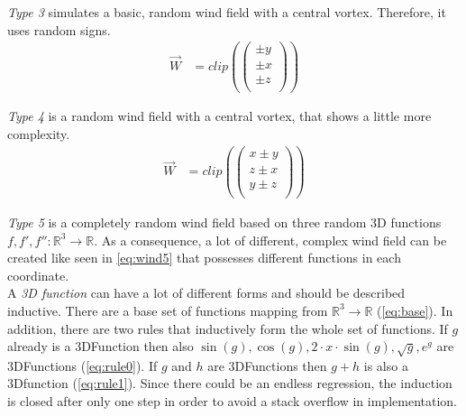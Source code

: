 \emph{Type 3} simulates a basic, random wind field with a central vortex. Therefore, it uses random signs.
\begin{align}
	\overrightarrow{W} &= clip(\left(
	\begin{array}{c}
		\pm y\\
		\pm x\\
		\pm z\\
	\end{array}
	\right))
\end{align}
\newline

\emph{Type 4} is a random wind field with a central vortex, that shows a little more complexity.
\begin{align}
	\overrightarrow{W} &= clip(\left(
	\begin{array}{c}
		x \pm y\\
		z \pm x\\
		y \pm z\\
	\end{array}
	\right))
\end{align}
\newline

\emph{Type 5} is a completely random wind field based on three random 3D functions $f, f', f'': \mathbb{R}^3 \to \mathbb{R}$. 
As a consequence, a lot of different, complex wind field can be created like seen in \cref{eq:wind5} that possesses different functions in each coordinate.\\

A \emph{3D function} can have a lot of different forms and should be described inductive. 
There are a base set of functions mapping from $\mathbb{R}^3 \to \mathbb{R}$ (\cref{eq:base}). 
In addition, there are two rules that inductively form the whole set of functions. 
If $g$ already is a 3DFunction then also $\sin(g), \cos(g), 2 \cdot x \cdot \sin(g), \sqrt{g}, e^g$ 
are 3DFunctions (\cref{eq:rule0}). If $g$ and $h$ are 3DFunctions then $g+h$ is also a 3Dfunction (\cref{eq:rule1}). 
Since there could be an endless regression, the induction is closed after only one step in order to avoid a stack overflow in implementation. 

